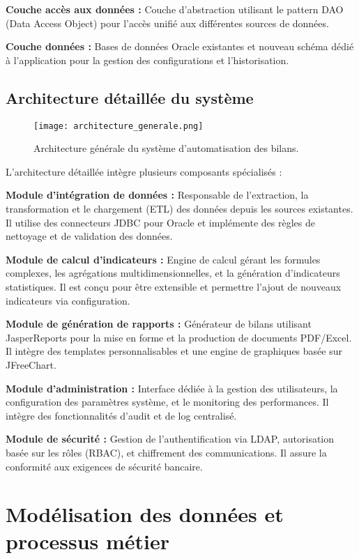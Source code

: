 \textbf{Couche accès aux données :} Couche d'abstraction utilisant le pattern DAO (Data Access Object) pour l'accès unifié aux différentes sources de données.

\textbf{Couche données :} Bases de données Oracle existantes et nouveau schéma dédié à l'application pour la gestion des configurations et l'historisation.

\subsection{Architecture détaillée du système}

\begin{figure}[hbt!]
    \centering
    \texttt{[image: architecture\_generale.png]}
    \caption{Architecture générale du système d'automatisation des bilans.}
    \label{fig:architecture-generale}
\end{figure}

L'architecture détaillée intègre plusieurs composants spécialisés :

\medskip

\textbf{Module d'intégration de données :} Responsable de l'extraction, la transformation et le chargement (ETL) des données depuis les sources existantes. Il utilise des connecteurs JDBC pour Oracle et implémente des règles de nettoyage et de validation des données.

\textbf{Module de calcul d'indicateurs :} Engine de calcul gérant les formules complexes, les agrégations multidimensionnelles, et la génération d'indicateurs statistiques. Il est conçu pour être extensible et permettre l'ajout de nouveaux indicateurs via configuration.

\textbf{Module de génération de rapports :} Générateur de bilans utilisant JasperReports pour la mise en forme et la production de documents PDF/Excel. Il intègre des templates personnalisables et une engine de graphiques basée sur JFreeChart.

\textbf{Module d'administration :} Interface dédiée à la gestion des utilisateurs, la configuration des paramètres système, et le monitoring des performances. Il intègre des fonctionnalités d'audit et de log centralisé.

\textbf{Module de sécurité :} Gestion de l'authentification via LDAP, autorisation basée sur les rôles (RBAC), et chiffrement des communications. Il assure la conformité aux exigences de sécurité bancaire.

\section{Modélisation des données et processus métier}

